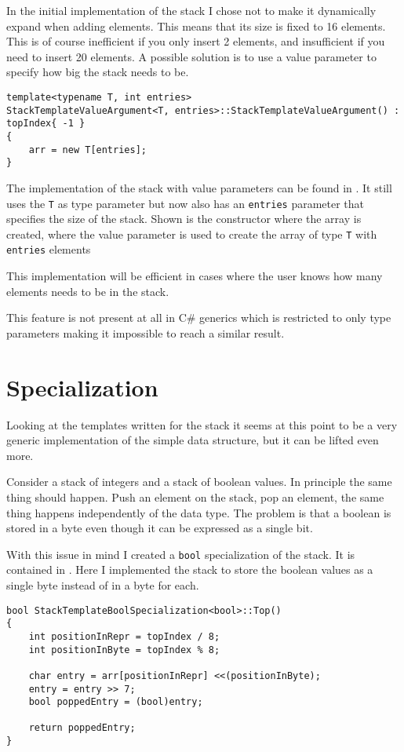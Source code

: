 In the initial implementation of the stack I chose not to make it dynamically expand when adding elements.
This means that its size is fixed to 16 elements.
This is of course inefficient if you only insert 2 elements, and insufficient if you need to insert 20 elements.
A possible solution is to use a value parameter to specify how big the stack needs to be.

\begin{lstlisting}
template<typename T, int entries>
StackTemplateValueArgument<T, entries>::StackTemplateValueArgument() : topIndex{ -1 }
{
	arr = new T[entries];
}
\end{lstlisting}


The implementation of the stack with value parameters can be found in .
It still uses the \texttt{T} as type parameter but now also has an \texttt{entries} parameter that specifies the size of the stack.
Shown is the constructor where the array is created, where the value parameter is used to create the array of type \texttt{T} with \texttt{entries} elements

This implementation will be efficient in cases where the user knows how many elements needs to be in the stack.

This feature is not present at all in C\# generics which is restricted to only type parameters making it impossible to reach a similar result\cite{cgenerics}.

\section{Specialization}
Looking at the templates written for the stack it seems at this point to be a very generic implementation of the simple data structure, but it can be lifted even more.

Consider a stack of integers and a stack of boolean values.
In principle the same thing should happen.
Push an element on the stack, pop an element, the same thing happens independently of the data type.
The problem is that a boolean is stored in a byte even though it can be expressed as a single bit.

With this issue in mind I created a \texttt{bool} specialization of the stack.
It is contained in .
Here I implemented the stack to store the boolean values as a single byte instead of in a byte for each.

\begin{lstlisting}
bool StackTemplateBoolSpecialization<bool>::Top()
{
	int positionInRepr = topIndex / 8;
	int positionInByte = topIndex % 8;

	char entry = arr[positionInRepr] <<(positionInByte);
	entry = entry >> 7;
	bool poppedEntry = (bool)entry;

	return poppedEntry;
}
\end{lstlisting}

